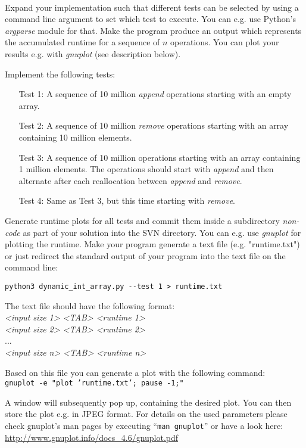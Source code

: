  \\
Expand your implementation such that different tests can be selected by 
using a command line argument to set which test to execute. 
You can e.g. use Python's \textit{argparse} module for that.
Make the program produce an output which represents the accumulated runtime
for a sequence of $n$ operations.
You can plot your results e.g. with \textit{gnuplot} (see description below).

Implement the following tests:
\begin{itemize}
  \item[Test 1:]
    A sequence of 10 million \textit{append} operations starting with an empty
    array.
  \item[Test 2:]
    A sequence of 10 million \textit{remove} operations starting with an array
    containing 10 million elements.
  \item[Test 3:]
    A sequence of 10 million operations starting with an array containing 1
    million elements.
    The operations should start with \textit{append} and then alternate after
    each reallocation between \textit{append} and \textit{remove}.
  \item[Test 4:]
    Same as Test 3, but this time starting with \textit{remove}.
\end{itemize}
Generate runtime plots for all tests and commit them inside a subdirectory
\textit{non-code} as part of your solution into the SVN directory.
You can e.g. use \textit{gnuplot} for plotting the runtime.
Make your program generate a text file (e.g. "runtime.txt") or just redirect
the standard output of your program into the text file on the command line:

\texttt{python3 dynamic\_int\_array.py -{}-test 1 > runtime.txt}

The text file should have the following format:\\
\textit{<input size 1> <TAB> <runtime 1>}\\
\textit{<input size 2> <TAB> <runtime 2>}\\
...\\
\textit{<input size n> <TAB> <runtime n>}

Based on this file you can generate a plot with the following command:\\
\texttt{gnuplot -e "plot 'runtime.txt'; pause -1;"}

A window will subsequently pop up, containing the desired plot.
You can then store the plot e.g. in JPEG format.
For details on the used parameters please check gnuplot’s man pages by
executing \enquote{\texttt{man gnuplot}} or have a look here:
\url{http://www.gnuplot.info/docs\_4.6/gnuplot.pdf}

